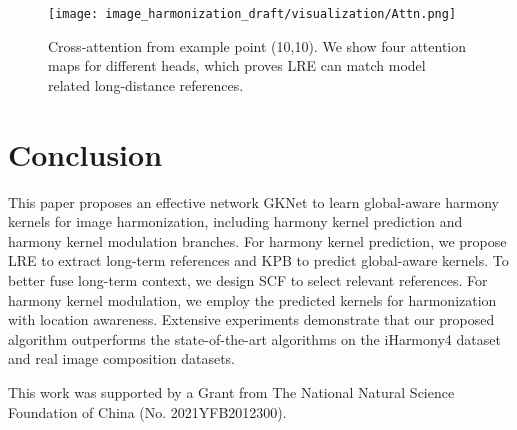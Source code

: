 \documentclass[10pt,twocolumn,letterpaper]{article}
\begin{document}
\begin{figure}[t]
    \centering
    \texttt{[image: image\_harmonization\_draft/visualization/Attn.png]}
    \caption{ Cross-attention from example point (10,10). We show four attention maps for different heads, which proves LRE can match model related long-distance references.}
    \label{fig:transformer}
    \vspace{-1.0em}
\end{figure}


\section{Conclusion}

This paper proposes an effective network GKNet to learn global-aware harmony kernels for image harmonization, including harmony kernel prediction and harmony kernel modulation branches. For harmony kernel prediction, we propose LRE to extract long-term references and KPB to predict global-aware kernels. To better fuse long-term context, we design SCF to select relevant references. For harmony kernel modulation, we employ the predicted kernels for harmonization with location awareness. Extensive experiments demonstrate that our proposed algorithm outperforms the state-of-the-art algorithms on the iHarmony4 dataset and real image composition datasets.

 This work was supported by a Grant from The National Natural Science Foundation of China (No. 2021YFB2012300).

{\small


}
\end{document}
